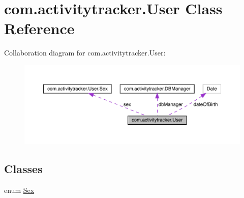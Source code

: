 \hypertarget{classcom_1_1activitytracker_1_1_user}{}\section{com.\+activitytracker.\+User Class Reference}
\label{classcom_1_1activitytracker_1_1_user}


Collaboration diagram for com.\+activitytracker.\+User\+:\nopagebreak
\begin{figure}[H]
\begin{center}
\leavevmode
\includegraphics[width=350pt]{classcom_1_1activitytracker_1_1_user__coll__graph}
\end{center}
\end{figure}
\subsection*{Classes}
\begin{DoxyCompactItemize}
\item 
enum \mbox{\hyperlink{enumcom_1_1activitytracker_1_1_user_1_1_sex}{Sex}}
\end{DoxyCompactItemize}
